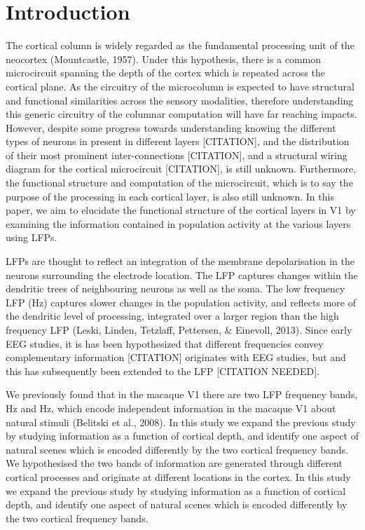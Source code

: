 \section{Introduction}
The cortical column is widely regarded as the fundamental processing unit of the neocortex (Mountcastle, 1957).
Under this hypothesis, there is a common microcircuit spanning the depth of the cortex which is repeated across the cortical plane.
As the circuitry of the microcolumn is expected to have structural and functional similarities across the sensory modalities, therefore understanding this generic circuitry of the columnar computation will have far reaching impacts.
However, despite some progress towards understanding knowing the different types of neurons in present in different layers [CITATION], and the distribution of their most prominent inter-connections [CITATION], and a structural wiring diagram for the cortical microcircuit [CITATION], is still unknown.
Furthermore, the functional structure and computation of the microcircuit, which is to say the purpose of the processing in each cortical layer, is also still unknown.
In this paper, we aim to elucidate the functional structure of the cortical layers in \ac{V1} by examining the information contained in population activity at the various layers using \acp{LFP}.

\acp{LFP} are thought to reflect an integration of the membrane depolarisation in the neurons surrounding the electrode location.
The \ac{LFP} captures changes within the dendritic trees of neighbouring neurons as well as the soma.
The low frequency \ac{LFP} (\unit[XXXX]{Hz}) captures slower changes in the population activity, and reflects more of the dendritic level of processing, integrated over a larger region than the high frequency \ac{LFP} (Leski, Linden, Tetzlaff, Pettersen, \& Einevoll, 2013).
Since early \ac{EEG} studies, it is has been hypothesized that different frequencies convey complementary information [CITATION] originates with \ac{EEG} studies, but and this has subsequently been extended to the \ac{LFP} [CITATION NEEDED].


We previously found that in the macaque \ac{V1} there are two \ac{LFP} frequency bands, \unit[1--8]{Hz} and \unit[60--100]{Hz}, which encode independent information in the macaque \ac{V1} about natural stimuli (Belitski et al., 2008).
In this study we expand the previous study by studying information as a function of cortical depth, and identify one aspect of natural scenes which is encoded differently by the two cortical frequency bands.
We hypothesised the two bands of information are generated through different cortical processes and originate at different locations in the cortex.
In this study we expand the previous study by studying information as a function of cortical depth, and identify one aspect of natural scenes which is encoded differently by the two cortical frequency bands.

